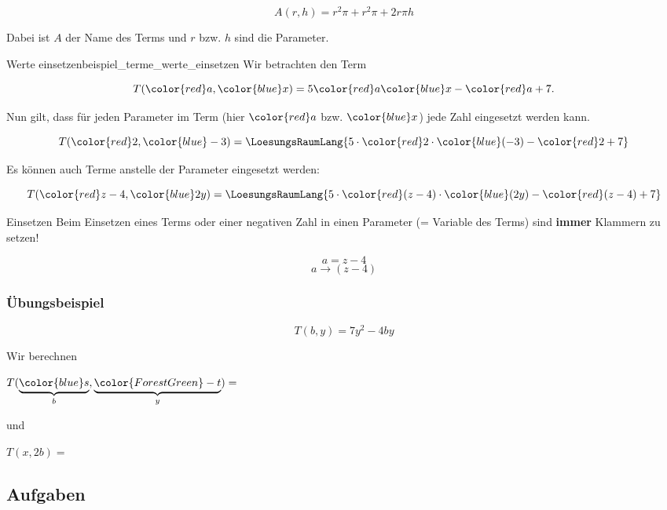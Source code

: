 $$A(r, h) = r^2\pi + r^2\pi + 2r\pi{}h$$

Dabei ist $A$ der Name des Terms und $r$ bzw. $h$ sind die Parameter.
\vspace{3mm}
\begin{beispiel}{Werte einsetzen}{beispiel_terme_werte_einsetzen}
  Wir betrachten den Term

  $$T({\color{red}a}, {\color{blue}x}) = 5{\color{red}a}{\color{blue}x} - {\color{red}a} + 7.$$

  Nun gilt, dass für jeden Parameter im Term (hier ${\color{red}a}$
  bzw. ${\color{blue}x}$) jede Zahl eingesetzt
  werden kann.\leserluft{}

  $$T({\color{red}2}, {\color{blue}-3}) = \LoesungsRaumLang{5\cdot{}{\color{red}2}\cdot{\color{blue}(-3)} - {\color{red}2} + 7}$$

  Es können auch Terme anstelle der Parameter eingesetzt
  werden:\leserluft{}

  $$T({\color{red}z-4}, {\color{blue}2y}) =
  \LoesungsRaumLang{5 \cdot{} {\color{red}(z-4)} \cdot {\color{blue}(2y)} - {\color{red}(z-4)} + 7}$$
\end{beispiel}

\begin{gesetz}{Einsetzen}{}
  Beim Einsetzen eines Terms oder einer negativen Zahl in einen
  Parameter (= Variable des Terms) sind \textbf{immer} Klammern zu setzen!


$$ a = z-4$$
$$ a  \rightarrow (z-4)$$

\end{gesetz}
\newpage

\subsubsection{Übungsbeispiel}
$$T(b, y) = 7y^2 - 4by$$

Wir berechnen


$T(\underbrace{{\color{blue}s}}_b, \underbrace{{\color{ForestGreen}-t}}_y) = $%

und

$T(x, 2b) = $ 



\subsection*{Aufgaben}

\newpage
